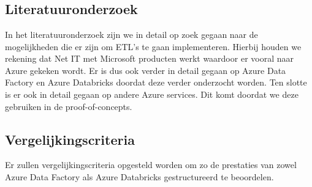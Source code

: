 
\chapter{}%
\label{ch:methodologie}


\section{Literatuuronderzoek}

In het literatuuronderzoek zijn we in detail op zoek gegaan naar de mogelijkheden die er zijn om ETL's te gaan implementeren. Hierbij houden we rekening dat Net IT met Microsoft producten werkt waardoor er vooral naar Azure gekeken wordt. Er is dus ook verder in detail gegaan op Azure Data Factory en Azure Databricks doordat deze verder onderzocht worden. Ten slotte is er ook in detail gegaan op andere Azure services. Dit komt doordat we deze gebruiken in de proof-of-concepts.

\section{Vergelijkingscriteria}

Er zullen vergelijkingscriteria opgesteld worden om zo de prestaties van zowel Azure Data Factory als Azure Databricks gestructureerd te beoordelen. 

